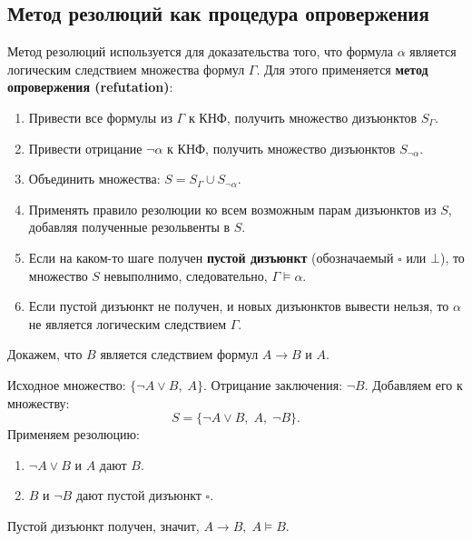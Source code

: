 \documentclass[10pt]{article}
\begin{document}
\subsection{Метод резолюций как процедура опровержения}
Метод резолюций используется для доказательства того, что формула \(\alpha\) является логическим следствием множества формул \(\Gamma\). Для этого применяется \textbf{метод опровержения (refutation)}:

\begin{enumerate}
\item Привести все формулы из \(\Gamma\) к КНФ, получить множество дизъюнктов \(S_\Gamma\).
\item Привести отрицание \(\neg\alpha\) к КНФ, получить множество дизъюнктов \(S_{\neg\alpha}\).
\item Объединить множества: \(S = S_\Gamma \cup S_{\neg\alpha}\).
\item Применять правило резолюции ко всем возможным парам дизъюнктов из \(S\), добавляя полученные резольвенты в \(S\).
\item Если на каком-то шаге получен \textbf{пустой дизъюнкт} (обозначаемый \(\square\) или \(\bot\)), то множество \(S\) невыполнимо, следовательно, \(\Gamma \models \alpha\).
\item Если пустой дизъюнкт не получен, и новых дизъюнктов вывести нельзя, то \(\alpha\) не является логическим следствием \(\Gamma\).
\end{enumerate}

\begin{example}
Докажем, что \(B\) является следствием формул \(A \to B\) и \(A\).

Исходное множество: \(\{ \neg A \lor B,\; A \}\). Отрицание заключения: \(\neg B\). Добавляем его к множеству: 
\[
S = \{ \neg A \lor B,\; A,\; \neg B \}.
\]
Применяем резолюцию:
\begin{enumerate}
\item \(\neg A \lor B\) и \(A\) дают \(B\).
\item \(B\) и \(\neg B\) дают пустой дизъюнкт \(\square\).
\end{enumerate}
Пустой дизъюнкт получен, значит, \(A \to B,\; A \models B\).
\end{example}
\end{document}
